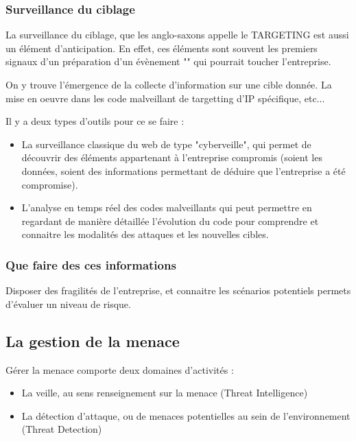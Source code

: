 \subsubsection{Surveillance du ciblage}


La surveillance du ciblage, que les anglo-saxons appelle le TARGETING est aussi un élément d'anticipation. 
En effet, ces éléments sont souvent les premiers signaux d'un préparation d'un évènement "" qui pourrait toucher l'entreprise.

On y trouve l'émergence de la collecte d'information sur une cible donnée. La mise en oeuvre dans les code malveillant de targetting d'IP spécifique, etc...

Il y a deux types d'outils pour ce se faire : 

\begin{itemize}
	\item La surveillance classique du web de type "cyberveille", qui permet de découvrir des éléments appartenant à l'entreprise compromis (soient les données, soient des informations permettant de déduire que l'entreprise a été compromise).
	\item L'analyse en temps réel des codes malveillants qui peut permettre en regardant de manière détaillée l'évolution du code pour comprendre et connaitre les modalités des attaques et les nouvelles cibles.
\end{itemize}


\subsubsection{Que faire des ces informations}

Disposer des fragilités de l'entreprise, et connaitre les scénarios potentiels permets d'évaluer un niveau de risque. 


\subsection{La gestion de la menace}




Gérer la menace comporte deux domaines d'activités :

\begin{itemize}
  \item La veille, au sens renseignement sur la menace (Threat Intelligence)
  \item La détection d'attaque, ou de menaces potentielles au sein de l'environnement (Threat Detection)
\end{itemize}

